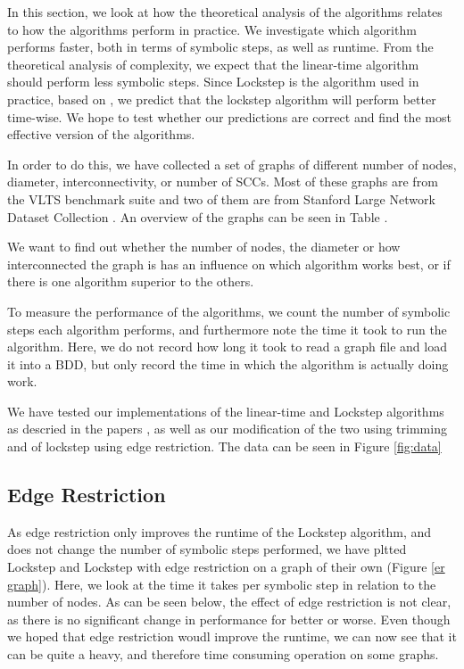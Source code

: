 \documentclass[../master/master.tex]{subfiles}
\begin{document}

In this section, we look at how the theoretical analysis of the algorithms relates to how the algorithms perform in practice. We investigate which algorithm performs faster, both in terms of symbolic steps, as well as runtime. From the theoretical analysis of complexity, we expect that the linear-time algorithm should perform less symbolic steps. Since Lockstep is the algorithm used in practice, based on , we predict that the lockstep algorithm will perform better time-wise. We hope to test whether our predictions are correct and find the most effective version of the algorithms.

In order to do this, we have collected a set of graphs of different number of nodes, diameter, interconnectivity, or number of SCCs. Most of these graphs are from the VLTS benchmark suite \cite{vlts} and two of them are from Stanford Large Network Dataset Collection \cite{snapnets}. An overview of the graphs can be seen in Table . 
 
We want to find out whether the number of nodes, the diameter or how interconnected the graph is has an influence on which algorithm works best, or if there is one algorithm superior to the others.

To measure the performance of the algorithms, we count the number of symbolic steps each algorithm performs, and furthermore note the time it took to run the algorithm. Here, we do not record how long it took to read a graph file and load it into a BDD, but only record the time in which the algorithm is actually doing work.

We have tested our implementations of the linear-time and Lockstep algorithms as descried in the papers \cite{linear}\cite{lockstep}, as well as our modification of the two using trimming and of lockstep using edge restriction. The data can be seen in Figure \ref{fig:data}

\subsection{Edge Restriction}
As edge restriction only improves the runtime of the Lockstep algorithm, and does not change the number of symbolic steps performed, we have pltted Lockstep and Lockstep with edge restriction on a graph of their own (Figure \ref{er graph}). Here, we look at the time it takes per symbolic step in relation to the number of nodes. As can be seen below, the effect of edge restriction is not clear, as there is no significant change in performance for better or worse. Even though we hoped that edge restriction woudl improve the runtime, we can now see that it can be quite a heavy, and therefore time consuming operation on some graphs.
\end{document}
